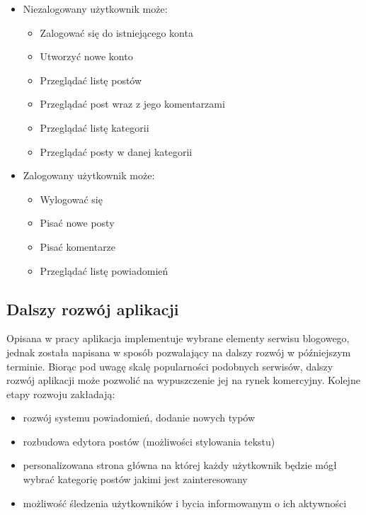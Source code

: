 \documentclass[declaration,shortabstract]{iithesis}
\begin{document}
\begin{itemize}
    \item Niezalogowany użytkownik może: 
    \begin{itemize}
         \item Zalogować się do istniejącego konta
         \item Utworzyć nowe konto
         \item Przeglądać listę postów
         \item Przeglądać post wraz z jego komentarzami
         \item Przeglądać listę kategorii
         \item Przeglądać posty w danej kategorii
    \end{itemize}
    \item Zalogowany użytkownik może:
        \begin{itemize}
            \item Wylogować się
            \item Pisać nowe posty
            \item Pisać komentarze
            \item Przeglądać listę powiadomień
        \end{itemize}
\end{itemize}

\subsection{Dalszy rozwój aplikacji}

Opisana w pracy aplikacja implementuje wybrane elementy serwisu blogowego, jednak została napisana w sposób pozwalający na dalszy rozwój w późniejszym terminie. Biorąc pod uwagę skalę popularności podobnych serwisów, dalszy rozwój aplikacji może pozwolić na wypuszczenie jej na rynek komercyjny. Kolejne etapy rozwoju zakładają:
\begin{itemize}
    \item rozwój systemu powiadomień, dodanie nowych typów
    \item rozbudowa edytora postów (możliwości stylowania tekstu)
    \item personalizowana strona główna na której każdy użytkownik będzie mógł wybrać kategorię postów jakimi jest zainteresowany
    \item możliwość śledzenia użytkowników i bycia informowanym o ich aktywności
\end{itemize}

\end{document}
